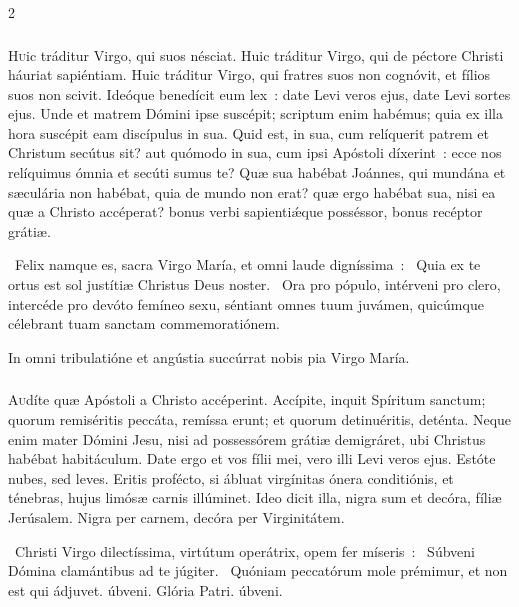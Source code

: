 \documentclass[9pt,twoside]{extarticle}
\begin{document}
\begin{multicols}{2}
\subsubsection*{\center {}}
\lettrine{H}uic tráditur Virgo, qui suos nésciat. Huic tráditur Virgo, qui de péctore Christi háuriat sapiéntiam. Huic tráditur Virgo, qui fratres suos non cognóvit, et fílios suos non scivit. Ideóque benedícit eum lex~: date Levi veros ejus, date Levi sortes ejus. Unde et matrem Dómini ipse suscépit; scriptum enim habémus; quia ex illa hora suscépit eam discípulus in sua. Quid est, in sua, cum relíquerit patrem et Christum secútus sit? aut quómodo in sua, cum ipsi Apóstoli díxerint~: ecce nos relíquimus ómnia et secúti sumus te? Quæ sua habébat Joánnes, qui mundána et sæculária non habébat, quia de mundo non erat? quæ ergo habébat sua, nisi ea quæ a Christo accéperat? bonus verbi sapientiǽque posséssor, bonus recéptor grátiæ.

\begin{tightlist}{}
\item {}~Felix namque es, sacra Virgo María, et omni laude digníssima~: \textred{*}~Quia ex te ortus est sol justítiæ Christus Deus noster.
~Ora pro pópulo, intérveni pro clero, intercéde pro devóto femíneo sexu, séntiant omnes tuum juvámen, quicúmque célebrant tuam sanctam commemoratiónem.
\item {\small {} In omni tribulatióne et angústia succúrrat nobis pia Virgo María.}
\end{tightlist}

\subsubsection*{\center {}}
\lettrine{A}udíte quæ Apóstoli a Christo accéperint. Accípite, inquit Spíritum sanctum; quorum remiséritis peccáta, remíssa erunt; et quorum detinuéritis, deténta. Neque enim mater Dómini Jesu, nisi ad possessórem grátiæ demigráret, ubi Christus habébat habitáculum. Date ergo et vos fílii mei, vero illi Levi veros ejus. Estóte nubes, sed leves. Eritis profécto, si ábluat virgínitas ónera conditiónis, et ténebras, hujus limósæ carnis illúminet. Ideo dicit illa, nigra sum et decóra, fíliæ Jerúsalem. Nigra per carnem, decóra per Virginitátem.

\begin{tightlist}{}
\item {}~Christi Virgo dilectíssima, virtútum operátrix, opem fer míseris~: \textred{*}~Súbveni Dómina clamántibus ad te júgiter.
~Quóniam peccatórum mole prémimur, et non est qui ádjuvet. úbveni. Glória Patri. úbveni.
\end{tightlist}


\end{multicols}
\end{document}
